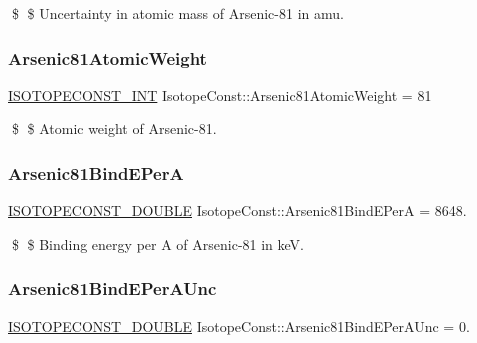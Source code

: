 \$ \$ Uncertainty in atomic mass of Arsenic-\/81 in amu. \mbox{\label{group___isotope_const-_arsenic-_as81_ga27744341b5944926bc14763f09924a87}} 
\subsubsection{\texorpdfstring{Arsenic81\+Atomic\+Weight}{Arsenic81AtomicWeight}}
{\footnotesize\ttfamily \mbox{\hyperlink{group___isotope_const-_macros_ga5f18360b3e99483a35c32d789e62621c}{I\+S\+O\+T\+O\+P\+E\+C\+O\+N\+S\+T\+\_\+\+I\+NT}} Isotope\+Const\+::\+Arsenic81\+Atomic\+Weight = 81}

\$ \$ Atomic weight of Arsenic-\/81. \mbox{\label{group___isotope_const-_arsenic-_as81_ga651e2cb0b9c682a7fa36304560335527}} 
\subsubsection{\texorpdfstring{Arsenic81\+Bind\+E\+PerA}{Arsenic81BindEPerA}}
{\footnotesize\ttfamily \mbox{\hyperlink{group___isotope_const-_macros_ga8f45a7272ce02c0b4c65c44636ed719a}{I\+S\+O\+T\+O\+P\+E\+C\+O\+N\+S\+T\+\_\+\+D\+O\+U\+B\+LE}} Isotope\+Const\+::\+Arsenic81\+Bind\+E\+PerA = 8648.}

\$ \$ Binding energy per A of Arsenic-\/81 in keV. \mbox{\label{group___isotope_const-_arsenic-_as81_ga6a62b1543ae4c263a955a0ff6426d0f8}} 
\subsubsection{\texorpdfstring{Arsenic81\+Bind\+E\+Per\+A\+Unc}{Arsenic81BindEPerAUnc}}
{\footnotesize\ttfamily \mbox{\hyperlink{group___isotope_const-_macros_ga8f45a7272ce02c0b4c65c44636ed719a}{I\+S\+O\+T\+O\+P\+E\+C\+O\+N\+S\+T\+\_\+\+D\+O\+U\+B\+LE}} Isotope\+Const\+::\+Arsenic81\+Bind\+E\+Per\+A\+Unc = 0.}

